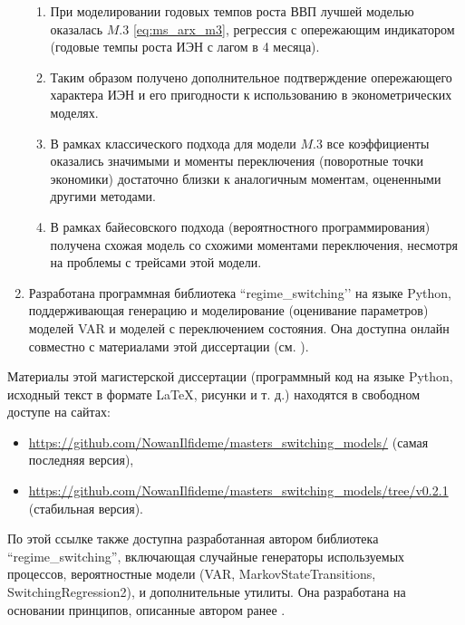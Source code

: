 \documentclass[a4paper,14pt]{extreport}
\newcommand{\coderepo}{https://github.com/NowanIlfideme/masters_switching_models}
\newcommand{\codeversion}{v0.2.1}
\newcommand{\genurl}[1]{\url{\coderepo/#1}}
\begin{document}
\begin{enumerate}
	      \begin{enumerate}
		      \item При моделировании годовых темпов роста ВВП лучшей моделью оказалась $M.3$ \eqref{eq:ms_arx_m3}, регрессия с опережающим индикатором (годовые темпы роста ИЭН с лагом в 4 месяца).
		      \item Таким образом получено дополнительное подтверждение опережающего характера ИЭН и его пригодности к использованию в эконометрических моделях.
		      \item В рамках классического подхода для модели $M.3$ все коэффициенты оказались значимыми и моменты переключения (поворотные точки экономики) достаточно близки к аналогичным моментам, оцененными другими методами.
		      \item В рамках байесовского подхода (вероятностного программирования) получена схожая модель со схожими моментами переключения, несмотря на проблемы с трейсами этой модели.
	      \end{enumerate}
	\item Разработана программная библиотека ``regime\_switching’’ на языке Python, поддерживающая генерацию и моделирование (оценивание параметров) моделей VAR и моделей с переключением состояния. Она доступна онлайн совместно с материалами этой диссертации (см. ).
\end{enumerate}


\printbibliography[title=Список использованных источников]


\appendix
{}

\label{appendix}

Материалы этой магистерской диссертации (программный код на языке Python, исходный текст в формате \LaTeX, рисунки и т. д.) находятся в свободном доступе на сайтах:

\begin{itemize}
	\item \genurl{} (самая последняя версия),
	\item \genurl{tree/\codeversion} (стабильная версия).
\end{itemize}

По этой ссылке также доступна разработанная автором библиотека ``regime\_switching'', включающая случайные генераторы используемых процессов, вероятностные модели (VAR, MarkovStateTransitions, SwitchingRegression2), и дополнительные утилиты. Она разработана на основании принципов, описанные автором ранее \cite{mak_auto_tsa}.
\end{document}
